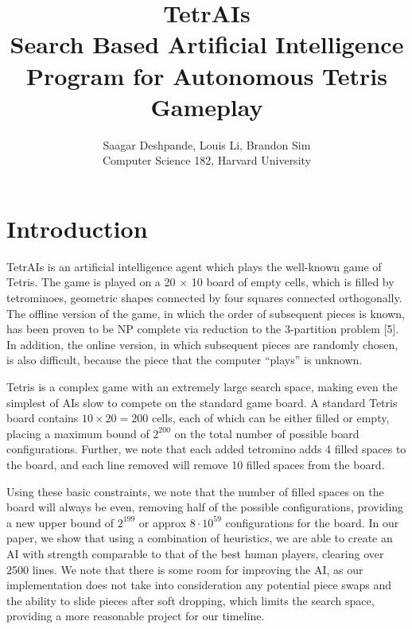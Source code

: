 \documentclass[12pt]{article}
\title{\textbf{TetrAIs}\\ {\small Search Based Artificial Intelligence Program for Autonomous Tetris Gameplay}}
\author{Saagar Deshpande, Louis Li, Brandon Sim\\ {\small Computer Science 182, Harvard University}}
\begin{document}
\maketitle
\tableofcontents
\newpage

\section{Introduction}
TetrAIs is an artificial intelligence agent which plays the well-known game of Tetris. The game is played on a 20 $\times$ 10 board of empty cells, which is filled by tetrominoes, geometric shapes connected by four squares connected orthogonally. The offline version of the game, in which the order of subsequent pieces is known, has been proven to be NP complete via reduction to the 3-partition problem [5]. In addition, the online version, in which subsequent pieces are randomly chosen, is also difficult, because the piece that the computer ``plays'' is unknown.

Tetris is a complex game with an extremely large search space, making even the simplest of AIs slow to compete on the standard game board. A standard Tetris board contains $10\times 20 = 200$ cells, each of which can be either filled or empty, placing a maximum bound of $2^{200}$ on the total number of possible board configurations. Further, we note that each added tetromino adds 4 filled spaces to the board, and each line removed will remove 10 filled spaces from the board. 

Using these basic constraints, we note that the number of filled spaces on the board will always be even, removing half of the possible configurations, providing a new upper bound of $2^{199}$ or approx $8\cdot 10^{59}$ configurations for the board. In our paper, we show that using a combination of heuristics, we are able to create an AI with strength comparable to that of the best human players, clearing over 2500 lines. We note that there is some room for improving the AI, as our implementation does not take into consideration any potential piece swaps and the ability to slide pieces after soft dropping, which limits the search space, providing a more reasonable project for our timeline.
\end{document}

